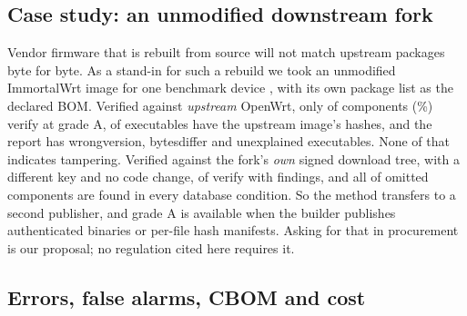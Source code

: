 \documentclass[sigconf,nonacm]{acmart}
\newcommand{\ubreak}{\textunderscore\allowbreak}
\newcommand{\vd}[1]{{\ttfamily\let\_\ubreak #1}}
\begin{document}
\subsection{Case study: an unmodified downstream fork}
\label{sec:fork}

Vendor firmware that is rebuilt from source will not match upstream packages byte for byte. As a stand-in for such a rebuild we took an unmodified ImmortalWrt \forkRelease{} image for one benchmark device \cite{immortalwrt}, with its own package list as the declared BOM. Verified against \emph{upstream} OpenWrt, only \forkUpVerA{} of \forkDeclared{} components (\forkUpVerAPct\%) verify at grade A, \forkExeSame{} of \forkExeTotal{} executables have the upstream image's hashes, and the report has \forkUpWrongVersion{} \vd{wrong\_version}, \forkUpBytesDiffer{} \vd{bytes\_differ} and \forkUpOrphans{} unexplained executables. None of that indicates tampering. Verified against the fork's \emph{own} signed download tree, with a different key and no code change, \forkOwnVerified{} of \forkDeclared{} verify with \forkOwnFindings{} findings, and all \forkOmittedFound{} of \forkOmitted{} omitted components are found in every database condition. So the method transfers to a second publisher, and grade A is available when the builder publishes authenticated binaries or per-file hash manifests. Asking for that in procurement is our proposal; no regulation cited here requires it.

\subsection{Errors, false alarms, CBOM and cost}
\end{document}
